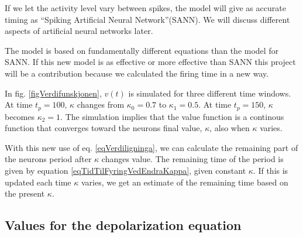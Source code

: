 If we let the activity level vary between spikes, the model will give as accurate timing as ``Spiking Artificial Neural Network''(SANN). We will discuss different aspects of artificial neural networks later. %

The model is based on fundamentally different equations than the model for SANN. 
If this new model is as effective or more effective than SANN this project will be a contribution because we calculated the firing time in a new way.





In fig. \ref{figVerdifunskjonen}, $v(t)$ is simulated for three different time windows. At time $t_p=100$, $\kappa$ changes from $\kappa_0=0.7$ to $\kappa_1=0.5$. At time $t_p=150$, $\kappa$ becomes $\kappa_2=1$. 
The simulation implies that the value function is a continous function that converges toward the neurons final value, $\kappa$, also when $\kappa$ varies.


With this new use of eq. \eqref{eqVerdiligninga}, we can calculate the remaining part of the neurons period after $\kappa$ changes value. 
The remaining time of the period is given by equation \eqref{eqTidTilFyringVedEndraKappa}, given constant $\kappa$. 
If this is updated each time $\kappa$ varies, we get an estimate of the remaining time based on the present $\kappa$.






\subsection{Values for the depolarization equation}
\label{sssecValueOfAlpha}

